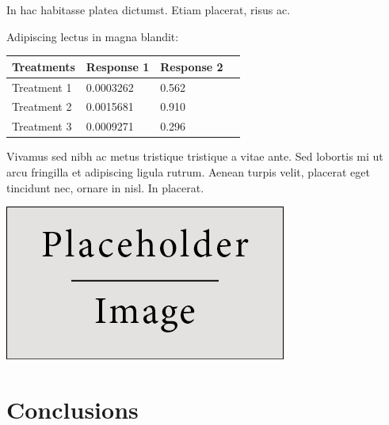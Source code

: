 \documentclass[a0,portrait]{a0poster}
\begin{document}
\begin{multicols}{2}
In hac habitasse platea dictumst. Etiam placerat, risus ac.

Adipiscing lectus in magna blandit:

\begin{center}\vspace{1cm}
\begin{tabular}{l l l l}
\toprule
\textbf{Treatments} & \textbf{Response 1} & \textbf{Response 2} \\
\midrule
Treatment 1 & 0.0003262 & 0.562 \\
Treatment 2 & 0.0015681 & 0.910 \\
Treatment 3 & 0.0009271 & 0.296 \\
\bottomrule
\end{tabular}
\end{center}\vspace{1cm}

Vivamus sed nibh ac metus tristique tristique a vitae ante. Sed lobortis mi ut arcu fringilla et adipiscing ligula rutrum. Aenean turpis velit, placerat eget tincidunt nec, ornare in nisl. In placerat.

\begin{center}\vspace{1cm}
\includegraphics[width=0.8\linewidth]{placeholder}
\end{center}\vspace{1cm}


\color{SaddleBrown} %

\section*{Conclusions}


\end{multicols}
\end{document}

